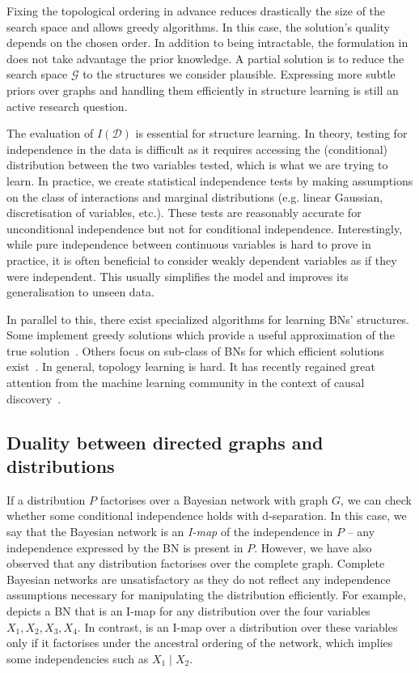Fixing the topological ordering in advance reduces drastically the size of the search space and allows greedy algorithms. In this case, the solution's quality depends on the chosen order. In addition to being intractable, the formulation in  does not take advantage the prior knowledge. A partial solution is to reduce the search space $\mathcal{G}$ to the structures we consider plausible. Expressing more subtle priors over graphs and handling them efficiently in structure learning is still an active research question.

The evaluation of $I(\mathcal{D})$ is essential for structure learning. In theory, testing for independence in the data is difficult as it requires accessing the (conditional) distribution between the two variables tested, which is what we are trying to learn. In practice, we create statistical independence tests by making assumptions on the class of interactions and marginal distributions (e.g. linear Gaussian, discretisation of variables, etc.). These tests are reasonably accurate for unconditional independence but not for conditional independence. Interestingly, while pure independence between continuous variables is hard to prove in practice, it is often beneficial to consider weakly dependent variables as if they were independent. This usually simplifies the model and improves its generalisation to unseen data.

In parallel to this, there exist specialized algorithms for learning BNs' structures. Some implement greedy solutions which provide a useful approximation of the true solution~\citep{tsamardinos2006max}. Others focus on sub-class of BNs for which efficient solutions exist~\citep{cooper1992Bayesian, chow1968approximating}. In general, topology learning is hard. It has recently regained great attention from the machine learning community in the context of causal discovery~\citep{khemakhem_causal_2020, balgi2022counterfactual, vowels2021d, brouillard2020differentiable}.


\subsection{Duality between directed graphs and distributions}
If a distribution $P$ factorises over a Bayesian network with graph $G$, we can check whether some conditional independence holds with d-separation. In this case, we say that the Bayesian network is an \textit{I-map} of the independence in $P$ -- any independence expressed by the BN is present in $P$. However, we have also observed that any distribution factorises over the complete graph. Complete Bayesian networks are unsatisfactory as they do not reflect any independence assumptions necessary for manipulating the distribution efficiently. For example,  depicts a BN that is an I-map for any distribution over the four variables $X_1, X_2, X_3, X_4$. In contrast,  is an I-map over a distribution over these variables only if it factorises under the ancestral ordering of the network, which implies some independencies such as $X_1 \mid X_2$.

